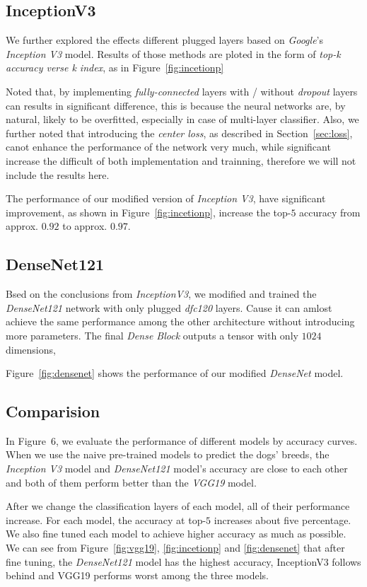 \documentclass{article}
\begin{document}
\subsection{InceptionV3}
We further explored the effects different plugged layers based on \emph{Google}'s \emph{Inception V3} model. 
Results of those methods are ploted in the form of \emph{top-k accuracy verse k index}, as in Figure~\ref{fig:incetionp}

Noted that, by implementing \emph{fully-connected} layers with / without \emph{dropout} layers can results in significant difference, 
this is because the neural networks are, by natural, likely to be overfitted, especially in case of multi-layer classifier. 
Also, we further noted that introducing the \emph{center loss}, as described in Section~\ref{sec:loss}, canot enhance the performance of the network very much, while significant increase the difficult of both implementation and trainning, therefore we will not include the results here. 

The performance of our modified version of \emph{Inception V3}, have significant improvement, as shown in Figure~\ref{fig:incetionp}, increase the top-$5$ accuracy from approx. $0.92$ to approx. $0.97$. 

\subsection{DenseNet121}
Bsed on the conclusions from \emph{InceptionV3}, we modified and trained the \emph{DenseNet121} network with only plugged \emph{dfc120} layers. Cause it can amlost achieve the same performance among the other architecture without introducing more parameters. 
The final \emph{Dense Block} outputs a tensor with only $1024$ dimensions, 

Figure~\ref{fig:densenet} shows the performance of our modified \emph{DenseNet} model. 

\subsection{Comparision}
In Figure~6, we evaluate the performance of different models by accuracy curves. When we use the naive pre-trained models to predict the dogs' breeds, the \emph{Inception V3} model and \emph{DenseNet121} model's accuracy are close to each other and both of them perform better than the \emph{VGG19} model. 

After we change the classification layers of each model, all of their performance increase. For each model, the accuracy at top-$5$ increases about five percentage. We also fine tuned each model to achieve higher accuracy as much as possible. 
We can see from Figure~\ref{fig:vgg19}, \ref{fig:incetionp} and \ref{fig:densenet} that after fine tuning, the \emph{DenseNet121} model has the highest accuracy, InceptionV3 follows behind and VGG19 performs worst among the three models.
\end{document}
